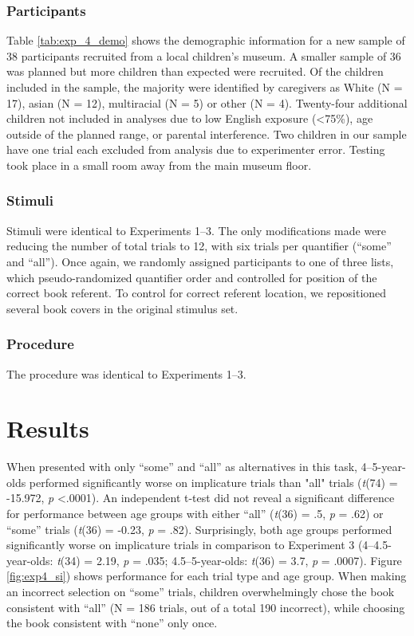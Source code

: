 \documentclass[man]{apa2}
\begin{document}
\subsubsection{Participants}

Table \ref{tab:exp_4_demo} shows the demographic information for a new sample of 38 participants recruited from a local children's museum. A smaller sample of 36 was planned but more children than expected were recruited. Of the children included in the sample, the majority were identified by caregivers as White (N = 17), asian (N = 12), multiracial (N = 5) or other (N = 4). Twenty-four additional children not included in analyses due to low English exposure (\textless 75\%), age outside of the planned range, or parental interference. Two children in our sample have one trial each excluded from analysis due to experimenter error. Testing took place in a small room away from the main museum floor.

\subsubsection{Stimuli}

Stimuli were identical to Experiments 1--3. The only modifications made were reducing the number of total trials to 12, with six trials per quantifier (``some'' and ``all''). Once again, we randomly assigned participants to one of three lists, which pseudo-randomized quantifier order and controlled for position of the correct book referent. To control for correct referent location, we repositioned several book covers in the original stimulus set.

\subsubsection{Procedure}

The procedure was identical to Experiments 1--3.

\section{Results}

When presented with only ``some'' and ``all'' as alternatives in this task, 4--5-year-olds performed significantly worse on implicature trials than "all" trials (\emph{t}(74) = -15.972, \emph{p} \textless .0001). An independent t-test did not reveal a significant difference for performance between age groups with either ``all'' (\emph{t}(36) = .5, \emph{p} = .62) or ``some'' trials (\emph{t}(36) = -0.23, \emph{p} = .82). Surprisingly, both age groups performed significantly worse on implicature trials in comparison to Experiment 3 (4--4.5-year-olds: \emph{t}(34) = 2.19, \emph{p} = .035; 4.5--5-year-olds: \emph{t}(36) = 3.7, \emph{p} = .0007). Figure \ref{fig:exp4_si}) shows performance for each trial type and age group.  When making an incorrect selection on ``some'' trials, children overwhelmingly chose the book consistent with ``all'' (N = 186 trials, out of a total 190 incorrect), while choosing the book consistent with ``none'' only once.
\end{document}
